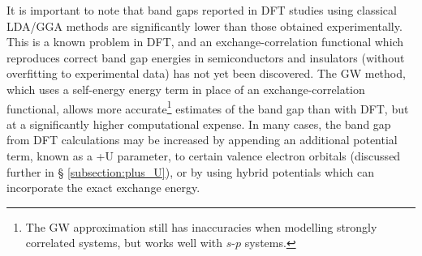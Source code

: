 It is important to note that band gaps reported in DFT studies using classical LDA/GGA methods are significantly lower than those obtained experimentally. This is a known problem in DFT, and an exchange-correlation functional which reproduces correct band gap energies in semiconductors and insulators (without overfitting to experimental data) has not yet been discovered. The GW method, which uses a self-energy energy term in place of an exchange-correlation functional, allows more accurate\footnote{The GW approximation still has inaccuracies when modelling strongly correlated systems, but works well with $s$-$p$ systems.} estimates of the band gap than with DFT, but at a significantly higher computational expense. In many cases, the band gap from DFT calculations may be increased by appending an additional potential term, known as a +U parameter, to certain valence electron orbitals (discussed further in § \ref{subsection:plus_U}), or by using hybrid potentials which can incorporate the exact exchange energy.







